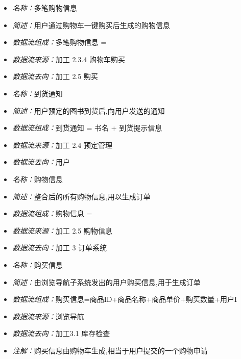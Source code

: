 \documentclass{article}
\begin{document}
\begin{CJK*}{UTF8}{gbsn}
\vspace{-1mm}

\begin{itemize}
	\item \textit{名称：}多笔购物信息
	\item \textit{简述：}用户通过购物车一键购买后生成的购物信息
	\item \textit{数据流组成：}多笔购物信息 = 
	\item \textit{数据流来源：}加工 2.3.4 购物车购买
	\item \textit{数据流去向：}加工 2.5 购买
\end{itemize}

\vspace{-1mm}

\begin{itemize}
	\item \textit{名称：}到货通知
	\item \textit{简述：}用户预定的图书到货后,向用户发送的通知
	\item \textit{数据流组成：}到货通知 = 书名 + 到货提示信息
	\item \textit{数据流来源：}加工 2.4 预定管理
	\item \textit{数据流去向：}用户
\end{itemize}

\vspace{-1mm}

\begin{itemize}
	\item \textit{名称：}购物信息
	\item \textit{简述：}整合后的所有购物信息,用以生成订单
	\item \textit{数据流组成：}购物信息 =
	\item \textit{数据流来源：}加工 2.5 购物信息
	\item \textit{数据流去向：}加工 3 订单系统
\end{itemize}

\vspace{-1mm}

\begin{itemize}
	\item \textit{名称：}购买信息
	\item \textit{简述：}由浏览导航子系统发出的用户购买信息,用于生成订单
	\item \textit{数据流组成：}购买信息=商品ID+商品名称+商品单价+购买数量+用户I
	\item \textit{数据流来源：}浏览导航
	\item \textit{数据流去向：}加工3.1 库存检查
	\item \textit{注解：}购买信息由购物车生成,相当于用户提交的一个购物申请
\end{itemize}


\end{CJK*}
\end{document}
